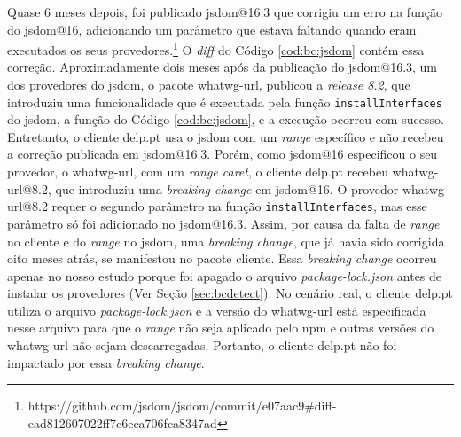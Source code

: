 Quase 6 meses depois, foi publicado \textsf{jsdom@16.3} que corrigiu um erro na função do \textsf{jsdom@16}, adicionando um parâmetro que estava faltando quando eram executados os seus provedores.\footnote{https://github.com/jsdom/jsdom/commit/e07aac9\#diff-ead812607022ff7c6eca706fca8347ad} O \textit{diff} do Código \ref{cod:bc:jsdom} contém essa correção. Aproximadamente dois meses após da publicação do \textsf{jsdom@16.3}, um dos provedores do \textsf{jsdom}, o pacote \textsf{whatwg-url}, publicou a \textit{release 8.2}, que introduziu uma funcionalidade que é executada pela função \texttt{installInterfaces} do \textsf{jsdom}, a função do Código \ref{cod:bc:jsdom}, e a execução ocorreu com sucesso. Entretanto, o cliente \textsf{delp.pt} usa o \textsf{jsdom} com um \textit{range} específico e não recebeu a correção publicada em \textsf{jsdom@16.3}. Porém, como \textsf{jsdom@16} especificou o seu provedor, o \textsf{whatwg-url}, com um \textit{range caret}, o cliente \textsf{delp.pt} recebeu \textsf{whatwg-url@8.2}, que introduziu uma \textit{breaking change} em \textsf{jsdom@16}. O provedor \textsf{whatwg-url@8.2} requer o segundo parâmetro na função \texttt{installInterfaces}, mas esse parâmetro só foi adicionado no \textsf{jsdom@16.3}. Assim, por causa da falta de \textit{range} no cliente e do \textit{range} no \textsf{jsdom}, uma \textit{breaking change}, que já havia sido corrigida oito meses atrás, se manifestou no pacote cliente. Essa \textit{breaking change} ocorreu apenas no nosso estudo porque foi apagado o arquivo \textit{package-lock.json} antes de instalar os provedores (Ver Seção \ref{sec:bcdetect}). No cenário real, o cliente \textsf{delp.pt} utiliza o arquivo \textit{package-lock.json} e a versão do \textsf{whatwg-url} está especificada nesse arquivo para que o \textit{range} não seja aplicado pelo \textsf{npm} e outras versões do \textsf{whatwg-url} não sejam descarregadas. Portanto, o cliente \textsf{delp.pt} não foi impactado por essa \textit{breaking change}.